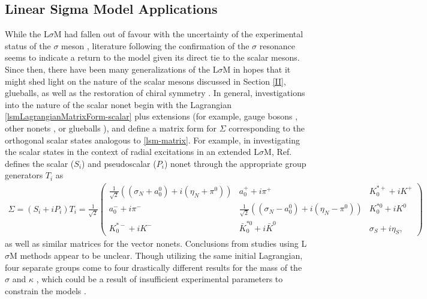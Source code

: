 \documentclass[aps,prd,onecolumn,showpacs,amsmath,amssymb,nofootinbib]{revtex4} \pdfoutput=1
\newcommand{\lsm}{L$\sigma$M}
\begin{document}
\subsection{Linear Sigma Model Applications}
While the {\lsm} had fallen out of favour with the uncertainty of the experimental status of the $\sigma$ meson \cite{Ecker1994}, literature following the confirmation of the $\sigma$ resonance \cite{Tornqvist1996} seems to indicate a return to the model given its direct tie to the scalar mesons. Since then, there have been many generalizations of the {\lsm} in hopes that it might shed light on the nature of the scalar mesons discussed in Section \ref{II}, glueballs, as well as the restoration of chiral symmetry \cite{Delbourgo1995,Delbourgo1998,Lenaghan2000,Fariborz2018}. In general, investigations into the nature of the scalar nonet begin with the Lagrangian \eqref{lsmLagrangianMatrixForm-scalar} plus extensions (for example, gauge bosons \cite{Fariborz2009}, other nonets \cite{Parganlija2017}, or glueballs \cite{Fariborz2018}), and define a matrix form for $\Sigma$ corresponding to the orthogonal scalar states analogous to \eqref{lsm-matrix}. For example, in investigating the scalar states in the context of radial excitations in an extended {\lsm}, Ref. \cite{Parganlija2017} defines the scalar ($S_i$) and pseudoscalar ($P_i$) nonet through the appropriate group generators $T_i$ as
\begin{gather}
   \Sigma =  (S_i + i P_i)T_i = \frac{1}{\sqrt{2}}\begin{pmatrix}
          \frac{1}{\sqrt{2}}((\sigma_N + a_0^0)+i(\eta_N + \pi^0)) & a_0^{+}+i\pi^{+} & K^{*+}_0 + iK^{+} \\
          a_0^{-}+i\pi^{-} & \frac{1}{\sqrt{2}}((\sigma_N - a_0^0)+i(\eta_N - \pi^0)) & K^{*0}_0 + iK^{0} \\
           K^{*-}_0 + iK^{-} & \bar{K}^{*0}_0 + i\bar{K}^{0} & \sigma_S + i \eta_S  \label{scalar-matrix2},
        \end{pmatrix}
\end{gather}
as well as similar matrices for the vector nonets. 
Conclusions from studies using {\lsm} methods appear to be unclear. Though utilizing the same initial Lagrangian, four separate groups come to four drastically different results for the mass of the $\sigma$ and $\kappa$ \cite{Napsuciale1998, Napsuciale2001,Tornqvist1999,tHooft2008,Black2001}, which could be a result of insufficient experimental parameters to constrain the models \cite{Bramon2004}.  
\end{document}

